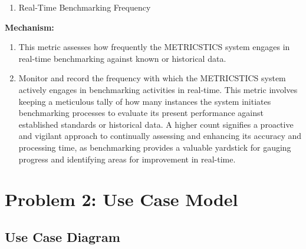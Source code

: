 \documentclass[12pt,letterpaper]{report}
\begin{document}
  

\begin{enumerate} 

        \item Real-Time Benchmarking Frequency 

\end{enumerate} 

\item \textbf{Mechanism:} 

\begin{enumerate} 

        \item This metric assesses how frequently the METRICSTICS system engages in real-time benchmarking against known or historical data. 

        \item Monitor and record the frequency with which the METRICSTICS system actively engages in benchmarking activities in real-time. This metric involves keeping a meticulous tally of how many instances the system initiates benchmarking processes to evaluate its present performance against established standards or historical data. A higher count signifies a proactive and vigilant approach to continually assessing and enhancing its accuracy and processing time, as benchmarking provides a valuable yardstick for gauging progress and identifying areas for improvement in real-time. 

\end{enumerate} 





\chapter{Problem 2: Use Case Model}
\section{Use Case Diagram}
\end{document}
